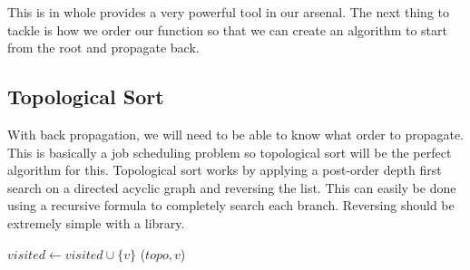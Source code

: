This is in whole provides a very powerful tool in our arsenal. The next thing to tackle is how we order our function 
so that we can create an algorithm to start from the root and propagate back.

\subsection{Topological Sort}

With back propagation, we will need to be able to know what order to propagate. 
This is basically a job scheduling problem so topological sort will be the perfect algorithm for this.
Topological sort works by applying a post-order depth first search on a directed acyclic graph 
and reversing the list. This can easily be done using a recursive formula to completely search each branch. Reversing should be extremely simple with a library.


\begin{algorithm}[H]
\caption{DFS for Topological Sort}
\label{alg:dfs_topo}
\begin{algorithmic}
        \State $visited \gets visited \cup \{v\}$
            \State {}
        \EndFor
        \State {}($topo, v$)
    \EndIf
\EndProcedure
\end{algorithmic}
\end{algorithm}
